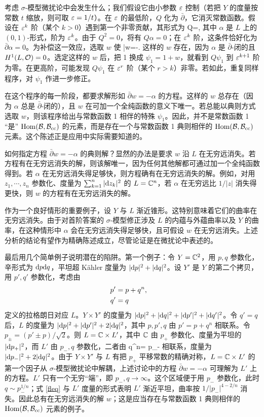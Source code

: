 考虑 $\sigma$-模型微扰论中会发生什么；我们假设它由小参数 $\varepsilon$ 控制（若把 $Y$ 的度量按常数 $t$ 缩放，则可取 $\varepsilon=1/t$）。在 $\varepsilon$ 的最低阶，$Q$ 化为 $\bar\partial$，它消灭常数函数。假设在 $\varepsilon^k$ 阶（某个 $k>0$）遇到第一个非零贡献，其形式为
\be\label{firstcor}Q=\alpha,\ee
其中 $\alpha$ 是 $L$ 上的 $(0,1)$-形式，阶为 $\varepsilon^k$。由于 $Q^2=0$，将有 $Q\alpha=0$；在 $\varepsilon^k$ 阶，这条件恰好化为 $\bar\partial\alpha=0$。为补偿这一效应，选取 $w$ 使
\be\label{newcor}\bar\partial w=-\alpha.\ee
这样的 $w$ 存在，因为 $\alpha$ 是 $\bar\partial$-闭的且 $H^1(L,{\mathcal O})=0$。选定这样的 $w$ 后，把 1 换成 $\psi_1=1+w$，就看到 $Q\psi_1$ 到 $\varepsilon^{k+1}$ 阶为零。在更高阶，可能发现 $Q\psi_1$ 在 $\varepsilon^r$ 阶（某个 $r>k$）非零。若如此，重复同样程序，对 $\psi_1$ 作进一步修正。

在这个程序的每一阶段，都要求解形如 $\bar\partial w=-\alpha$ 的方程。这样的 $w$ 总存在（因为 $\alpha$ 总是 $\bar\partial$-闭的），且 $w$ 在可加一个全纯函数的意义下唯一。若总能以典则方式选取 $w$，则该程序给出与常数函数 1 相伴的特殊 $\psi_1$。因此，并不是常数函数 1 “是” ${\mathrm{Hom}}({\mathcal B},{\mathcal B}_{\mathrm{cc}})$ 的元素，而是存在一个与常数函数 1 典则相伴的 ${\mathrm{Hom}}({\mathcal B},{\mathcal B}_{\mathrm{cc}})$ 元素。这个陈述正是应用中实际需要知道的。

如何指定方程 $\bar\partial w=-\alpha$ 的典则解？显然的办法是要求 $w$ 沿 $L$ 在无穷远消失。若方程有在无穷远消失的解，则该解唯一，因为任何其他解都可通过加一个全纯函数得到。若 $\alpha$ 在无穷远消失得足够快，则方程确有在无穷远消失的解。例如，对用 $z_1,\cdots,z_n$ 参数化、度量为 $\sum_{k=1}^n|{\mathrm d} z_k|^2$ 的 $L={\mathbb C}^n$，若 $\alpha$ 在无穷远比 $1/|z|$ 消失得更快，则 $w$ 的方程有在无穷远消失的解。

作为一个良好情形的重要例子，设 $Y$ 与 $L$ 渐近锥形。这特别意味着它们的曲率在无穷远消失。由于对首阶答案的 $\sigma$-模型修正涉及 $L$ 的内蕴与外蕴曲率以及 $Y$ 的曲率，在这种情形中 $\alpha$ 会在无穷远消失得足够快，且可假设 $w$ 在无穷远消失。上述分析的结论有望作为精确陈述成立，尽管论证是在微扰论中表述的。

最后用几个简单例子说明潜在的陷阱。第一个例子：令 $Y={\mathbb C}^2$，用 $p,q$ 参数化，辛形式为 ${\mathrm d} p{\mathrm d} q$，平坦超 Kähler 度量为 $|{\mathrm d} p|^2+|{\mathrm d} q|^2$。设 $Y'$ 是 $Y$ 的第二个拷贝，用 $p',q'$ 参数化，考虑由
\begin{align}\label{cordef}p'&=p+q^n,\cr q'&=q\end{align}
定义的拉格朗日对应 $L$。$Y\times Y'$ 的度量为 $|{\mathrm d} p|^2+|{\mathrm d} q|^2+|{\mathrm d} p'|^2+|{\mathrm d} q'|^2$。令 $q'=q$ 后，$L$ 的度量为 $|{\mathrm d} p|^2+|{\mathrm d} p'|^2+2|{\mathrm d} q|^2$，其中 $p,p',q$ 由 $p'=p+q^n$ 相联系。令 $p_\pm=(p'\pm p)/\sqrt2$。则 $L={\mathbb C}\times L'$，其中 ${\mathbb C}$ 由 $p_+$ 参数化、度量为平坦的 $|{\mathrm d} p_+|^2$，而 $L'$ 由 $p_-,q$ 参数化，二者由
\be\label{fleq}q^n= p_-\ee
相联系，度量为 $|{\mathrm d} p_-|^2+2|{\mathrm d} q|^2$。由于 $Y\times Y'$ 与 $L$ 有把 $p_+$ 平移常数的精确对称，$L={\mathbb C}\times L'$ 的第一个因子从 $\sigma$-模型微扰论中解耦，上述讨论中的方程 $\bar\partial w=-\alpha$ 可理解为 $L'$ 上的方程。$L'$ 只有一个无穷“端”，即 $p_-,q\to\infty$。这个区域便于用 $p_-$ 参数化，此时 $q\sim p_-^{1/n}$；式 \eqref{fleq} 与 $L'$ 度量的形式表明 $L'$ 渐近平坦，曲率按 $1/|p_-|^{4-2/n}$ 消失。因此总有在无穷远消失的解 $w$；这是应当存在与常数函数 1 典则相伴的 ${\mathrm{Hom}}({\mathcal B},{\mathcal B}_{\mathrm{cc}})$ 元素的例子。


